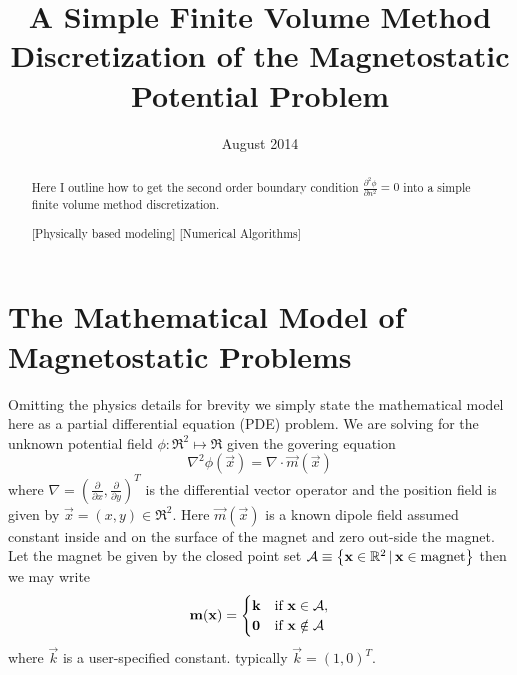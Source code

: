 \documentclass[preprint,nocopyrightspace]{sigplanconf}
\title{A Simple Finite Volume Method Discretization of the
  Magnetostatic Potential Problem}
\date{ August 2014 }
\begin{document}
\maketitle
\begin{abstract} 
Here I outline how to get the second order boundary condition
$\frac{\partial^2 \phi}{\partial n^2} = 0$ into a simple finite volume
method discretization.

[Physically based modeling]
[Numerical Algorithms]
\end{abstract}


\section{The Mathematical Model of Magnetostatic Problems}
\label{sec:model}
Omitting the physics details for brevity we simply state the
mathematical model here as a partial differential equation (PDE)
problem. We are solving for the unknown potential field $\phi : \Re^2
\mapsto \Re$ given the govering equation
\begin{equation}
  \nabla^2 \phi(\vec x) = \nabla \cdot \vec m(\vec x)
\end{equation}
where $\nabla = ( \frac{\partial }{\partial x}, \frac{\partial
}{\partial y})^T$ is the differential vector operator and the position
field is given by $\vec x = (x,y) \in \Re^2$. Here $\vec m(\vec x)$ is
a known dipole field assumed constant inside and on the surface of the
magnet and zero out-side the magnet. Let the magnet be given by the
closed point set $\mathcal{A} \equiv \left\{ \mathbf{x}  \in \mathbb{R}^2 \, |\, \mathbf{x}  \in \text{magnet}
\right\}$ then we may write
\begin{equation}
  \mathbf{m} (\mathbf{x} ) =
  \begin{cases}
    \mathbf{k}  & \text{if $\mathbf{x}  \in \mathcal{A}$}, \\
    \mathbf{0}  & \text{if $\mathbf{x}  \notin \mathcal{A}$}
  \end{cases}
\end{equation}
where $\vec k$ is a user-specified constant. typically $\vec k =
(1,0)^T$.
\end{document}
